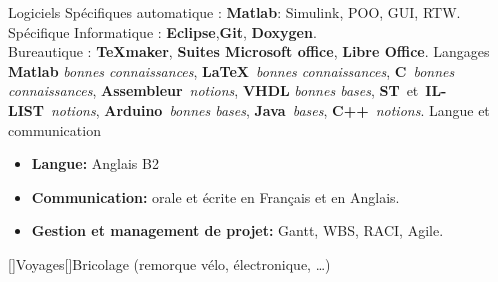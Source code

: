 \documentclass[11pt,a4paper,sans]{moderncv}        %
\newcommand{\myitem}{\textbullet}
\begin{document}
\begin{samepage}
%		
%
\tripleitemiseavecTitre%
{Logiciels}%
{{%
	Spécifiques automatique : {\small \textbf{Matlab}: Simulink, POO, GUI, RTW}.\\
	Spécifique Informatique : {\small \textbf{Eclipse},\textbf{Git}, \textbf{Doxygen}}.\\
	Bureautique : {\small \textbf{\TeX maker}, \textbf{Suites Microsoft office}, \textbf{Libre Office}.}%
}}%
{Langages}%
{%
	\textbf{Matlab} \textit{bonnes connaissances}, \textbf{\LaTeX}~\textit{bonnes connaissances}, \textbf{C}~\textit{bonnes connaissances}, 	\textbf{Assembleur}~\textit{notions}, \textbf{VHDL} \textit{bonnes bases}, \textbf{ST}~et~\textbf{IL-LIST}~\textit{notions}, \textbf{Arduino}~\textit{bonnes bases}, \textbf{Java}~\textit{bases}, \textbf{C++}~\textit{notions}.%
}%
{Langue et communication}%
{{%
	\begin{itemize}[label=\myitem]%
	\item \textbf{Langue: } {\small Anglais B2}%
	\item \textbf{Communication: } {\small orale et écrite en Français et en Anglais.} %
	\item \textbf{Gestion et management de projet: } {\small Gantt, WBS, RACI, Agile.}%
	\end{itemize}%
}}%
\vspace*{-8mm}%
[\bcfleur]{Voyages}[\bcvelo]{Bricolage (remorque vélo, électronique, …)}%
\end{samepage}%
\end{document}
